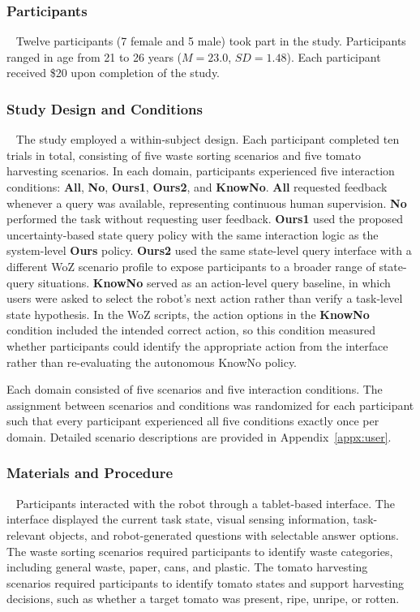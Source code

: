\subsubsection{Participants}~\label{user:participants}
Twelve participants (7 female and 5 male) took part in the study. Participants ranged in age from 21 to 26 years ($M=23.0$, $SD=1.48$). Each participant received \$20 upon completion of the study.

\subsubsection{Study Design and Conditions}~\label{user:design}
The study employed a within-subject design. Each participant completed ten trials in total, consisting of five waste sorting scenarios and five tomato harvesting scenarios. In each domain, participants experienced five interaction conditions: \textbf{All}, \textbf{No}, \textbf{Ours1}, \textbf{Ours2}, and \textbf{KnowNo}. \textbf{All} requested feedback whenever a query was available, representing continuous human supervision. \textbf{No} performed the task without requesting user feedback. \textbf{Ours1} used the proposed uncertainty-based state query policy with the same interaction logic as the system-level \textbf{Ours} policy. \textbf{Ours2} used the same state-level query interface with a different WoZ scenario profile to expose participants to a broader range of state-query situations. \textbf{KnowNo} served as an action-level query baseline, in which users were asked to select the robot's next action rather than verify a task-level state hypothesis. In the WoZ scripts, the action options in the \textbf{KnowNo} condition included the intended correct action, so this condition measured whether participants could identify the appropriate action from the interface rather than re-evaluating the autonomous KnowNo policy.

Each domain consisted of five scenarios and five interaction conditions. The assignment between scenarios and conditions was randomized for each participant such that every participant experienced all five conditions exactly once per domain. Detailed scenario descriptions are provided in Appendix~\ref{appx:user}.

\subsubsection{Materials and Procedure}~\label{user:materials_procedure}
Participants interacted with the robot through a tablet-based interface. The interface displayed the current task state, visual sensing information, task-relevant objects, and robot-generated questions with selectable answer options. The waste sorting scenarios required participants to identify waste categories, including general waste, paper, cans, and plastic. The tomato harvesting scenarios required participants to identify tomato states and support harvesting decisions, such as whether a target tomato was present, ripe, unripe, or rotten.

